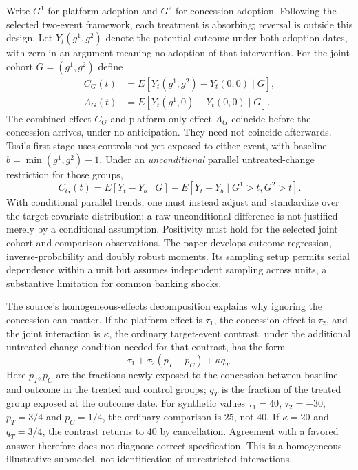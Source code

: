 Write $G^1$ for platform adoption and $G^2$ for concession adoption. Following the selected two-event framework, each
treatment is absorbing; reversal is outside this design. Let $Y_t(g^1,g^2)$ denote the potential outcome under both adoption
dates, with zero in an argument meaning no adoption of that intervention. For the joint cohort $G=(g^1,g^2)$ define
\begin{align*}
 C_G(t)&=E[Y_t(g^1,g^2)-Y_t(0,0)\mid G],\\
 A_G(t)&=E[Y_t(g^1,0)-Y_t(0,0)\mid G].
\end{align*}
The combined effect $C_G$ and platform-only effect $A_G$ coincide before the concession arrives, under no anticipation.
They need not coincide afterwards. Tsai's first stage uses controls not yet exposed to either event, with baseline
$b=\min(g^1,g^2)-1$. Under an \emph{unconditional} parallel untreated-change restriction for those groups,
\[
 C_G(t)=E[Y_t-Y_b\mid G]-E[Y_t-Y_b\mid G^1>t,G^2>t].
\]
With conditional parallel trends, one must instead adjust and standardize over the target covariate distribution; a raw
unconditional difference is not justified merely by a conditional assumption. Positivity must hold for the selected joint
cohort and comparison observations. The paper develops outcome-regression, inverse-probability and doubly robust moments.
Its sampling setup permits serial dependence within a unit but assumes independent sampling across units, a substantive
limitation for common banking shocks.~\citep{exec28_panel_tsai}

The source's homogeneous-effects decomposition explains why ignoring the concession can matter. If the platform effect is
$\tau_1$, the concession effect is $\tau_2$, and the joint interaction is $\kappa$, the ordinary target-event contrast,
under the additional untreated-change condition needed for that contrast, has the form
\[
 \tau_1+\tau_2(p_T-p_C)+\kappa q_T.
\]
Here $p_T,p_C$ are the fractions newly exposed to the concession between baseline and outcome in the treated and control
groups; $q_T$ is the fraction of the treated group exposed at the outcome date. For synthetic values $\tau_1=40$,
$\tau_2=-30$, $p_T=3/4$ and $p_C=1/4$, the ordinary comparison is $25$, not $40$. If $\kappa=20$ and $q_T=3/4$,
the contrast returns to $40$ by cancellation. Agreement with a favored answer therefore does not diagnose correct
specification. This is a homogeneous illustrative submodel, not identification of unrestricted interactions.
\citep{exec28_panel_tsai,exec28_panel_reference}

